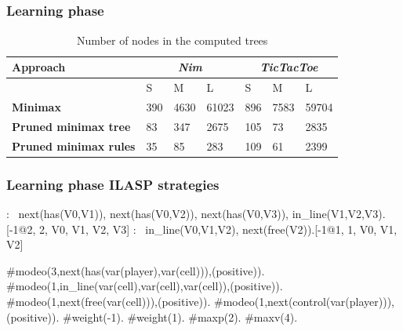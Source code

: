 \documentclass{beamer}
\begin{document}
\subsection{}
\begin{framefont}{\footnotesize}
  \begin{frame}
    \frametitle{Learning phase}
\begin{table}[]
    \begin{tabular}{*7l}
    \toprule
\textbf{Approach} &  \multicolumn{3}{c}{\textit{Nim}} & \multicolumn{3}{c}{\textit{TicTacToe}}\\
  \midrule
  
  {} & S  & M & L & S  & M & L
  \\
  \midrule[0.35mm]
  \textbf{Minimax}  & 390 & 4630 & 61023
  & 896 & 7583 & 59704
  \\[20pt]
  \textbf{Pruned minimax tree}   & 83 & 347 & 2675 & 105 & 73 & 2835
  \\[20pt]
  \textbf{Pruned minimax rules} & 35 & 85 & 283 & 109 & 61 & 2399 
  \\
\bottomrule
\end{tabular}
\caption{Number of nodes in the computed trees}

\end{table}
    
  \end{frame}
\end{framefont}


\begin{frame}[fragile]
  \footnotesize
  \frametitle{Learning phase ILASP strategies}
  
  \begin{example}
    \begin{semiverbatim}
:~ next(has(V0,V1)), next(has(V0,V2)), next(has(V0,V3)),
   in_line(V1,V2,V3).[-1@2, 2, V0, V1, V2, V3]
:~ in_line(V0,V1,V2), next(free(V2)).[-1@1, 1, V0, V1, V2]
    \end{semiverbatim}
  \end{example}
  \pause
  \begin{example}
    \begin{semiverbatim}
#modeo(3,next(has(var(player),var(cell))),(positive)).
#modeo(1,in\_line(var(cell),var(cell),var(cell)),(positive)).
#modeo(1,next(free(var(cell))),(positive)).
#modeo(1,next(control(var(player))),(positive)).
#weight(-1). #weight(1).
#maxp(2). #maxv(4). 
  \end{semiverbatim}
  \end{example}
\end{frame}
\end{document}
